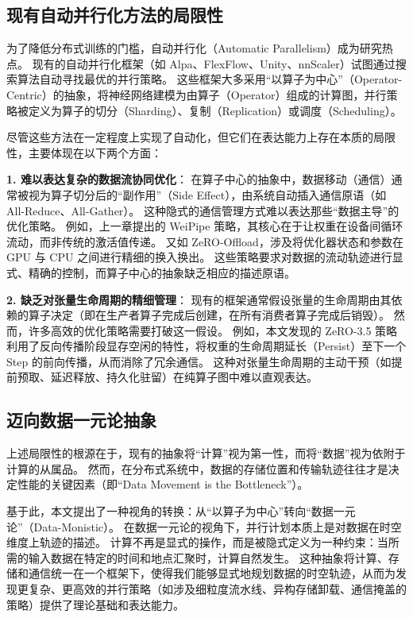 \subsection{现有自动并行化方法的局限性}
为了降低分布式训练的门槛，自动并行化（Automatic Parallelism）成为研究热点。
现有的自动并行化框架（如 Alpa、FlexFlow、Unity、nnScaler）试图通过搜索算法自动寻找最优的并行策略。
这些框架大多采用“以算子为中心”（Operator-Centric）的抽象，将神经网络建模为由算子（Operator）组成的计算图，并行策略被定义为算子的切分（Sharding）、复制（Replication）或调度（Scheduling）。

尽管这些方法在一定程度上实现了自动化，但它们在表达能力上存在本质的局限性，主要体现在以下两个方面：

\textbf{1. 难以表达复杂的数据流协同优化}：
在算子中心的抽象中，数据移动（通信）通常被视为算子切分后的“副作用”（Side Effect），由系统自动插入通信原语（如 All-Reduce、All-Gather）。
这种隐式的通信管理方式难以表达那些“数据主导”的优化策略。
例如，上一章提出的 WeiPipe 策略，其核心在于让权重在设备间循环流动，而非传统的激活值传递。
又如 ZeRO-Offload，涉及将优化器状态和参数在 GPU 与 CPU 之间进行精细的换入换出。
这些策略要求对数据的流动轨迹进行显式、精确的控制，而算子中心的抽象缺乏相应的描述原语。

\textbf{2. 缺乏对张量生命周期的精细管理}：
现有的框架通常假设张量的生命周期由其依赖的算子决定（即在生产者算子完成后创建，在所有消费者算子完成后销毁）。
然而，许多高效的优化策略需要打破这一假设。
例如，本文发现的 ZeRO-3.5 策略利用了反向传播阶段显存空闲的特性，将权重的生命周期延长（Persist）至下一个 Step 的前向传播，从而消除了冗余通信。
这种对张量生命周期的主动干预（如提前预取、延迟释放、持久化驻留）在纯算子图中难以直观表达。

\subsection{迈向数据一元论抽象}
上述局限性的根源在于，现有的抽象将“计算”视为第一性，而将“数据”视为依附于计算的从属品。
然而，在分布式系统中，数据的存储位置和传输轨迹往往才是决定性能的关键因素（即“Data Movement is the Bottleneck”）。

基于此，本文提出了一种视角的转换：从“以算子为中心”转向“数据一元论”（Data-Monistic）。
在数据一元论的视角下，并行计划本质上是对数据在时空维度上轨迹的描述。
计算不再是显式的操作，而是被隐式定义为一种约束：当所需的输入数据在特定的时间和地点汇聚时，计算自然发生。
这种抽象将计算、存储和通信统一在一个框架下，使得我们能够显式地规划数据的时空轨迹，从而为发现更复杂、更高效的并行策略（如涉及细粒度流水线、异构存储卸载、通信掩盖的策略）提供了理论基础和表达能力。


